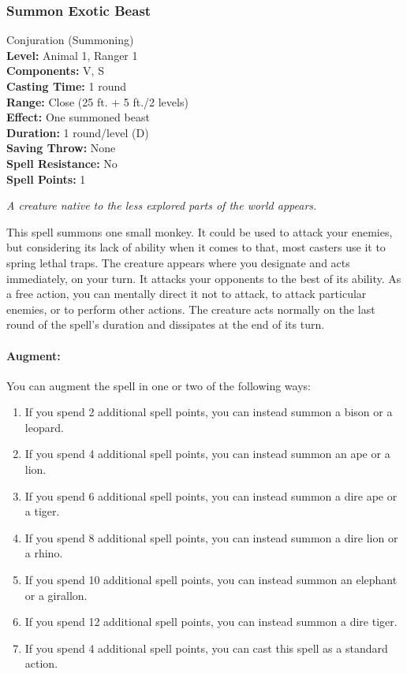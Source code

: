 \subsubsection{Summon Exotic Beast}
\label{Spell:SummonExoticBeast}
Conjuration (Summoning)
\\ \textbf{Level:} Animal 1, Ranger 1
\\ \textbf{Components:} V, S
\\ \textbf{Casting Time:} 1 round
\\ \textbf{Range:} Close (25 ft. + 5 ft./2 levels)
\\ \textbf{Effect:} One summoned beast
\\ \textbf{Duration:} 1 round/level (D)
\\ \textbf{Saving Throw:} None
\\ \textbf{Spell Resistance:} No
\\ \textbf{Spell Points:} 1

\emph{A creature native to the less explored parts of the world appears.}

This spell summons one small monkey. It could be used to attack your enemies, but considering its lack of ability when it comes to that, most casters use it to spring lethal traps.
The creature appears where you designate and acts immediately, on your turn. 
It attacks your opponents to the best of its ability. 
As a free action, you can mentally direct it not to attack, to attack particular enemies, or to perform other actions. 
The creature acts normally on the last round of the spell's duration and dissipates at the end of its turn.

\paragraph{Augment:} You can augment the spell in one or two of the following ways: 
\begin{enumerate}
 \item If you spend 2 additional spell points, you can instead summon a bison or a leopard.
 \item If you spend 4 additional spell points, you can instead summon an ape or a lion. 
 \item If you spend 6 additional spell points, you can instead summon a dire ape or a tiger.
 \item If you spend 8 additional spell points, you can instead summon a dire lion or a rhino.
 \item If you spend 10 additional spell points, you can instead summon an elephant or a girallon.
 \item If you spend 12 additional spell points, you can instead summon a dire tiger.
 \item If you spend 4 additional spell points, you can cast this spell as a standard action.
\end{enumerate}
